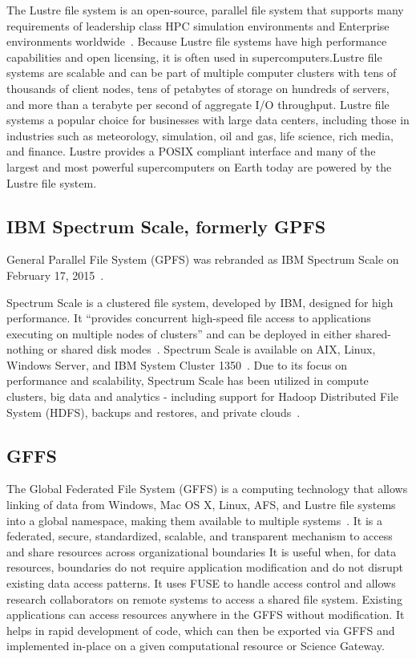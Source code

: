 The Lustre file system is an open-source, parallel file system that
supports many requirements of leadership class HPC simulation
environments and Enterprise environments
worldwide~\cite{www-lustre}. Because Lustre file systems have high
performance capabilities and open licensing, it is often used in
supercomputers.Lustre file systems are scalable and can be part of
multiple computer clusters with tens of thousands of client nodes,
tens of petabytes of storage on hundreds of servers, and more than a
terabyte per second of aggregate I/O throughput. Lustre file systems a
popular choice for businesses with large data centers, including those
in industries such as meteorology, simulation, oil and gas, life
science, rich media, and finance. Lustre provides a POSIX compliant
interface and many of the largest and most powerful supercomputers on
Earth today are powered by the Lustre file system.

     \pv
     
\subsection{IBM Spectrum Scale, formerly GPFS}

General Parallel File System (GPFS) was rebranded as IBM Spectrum
Scale on February 17, 2015~\cite{www-wikigpfs}.

Spectrum Scale is a clustered file system, developed by IBM, designed
for high performance. It ``provides concurrent high-speed file access
to applications executing on multiple nodes of clusters'' and can be
deployed in either shared-nothing or shared disk
modes~\cite{www-wikigpfs}.  Spectrum Scale is available on AIX, Linux,
Windows Server, and IBM System Cluster 1350~\cite{www-wikigpfs}.  Due
to its focus on performance and scalability, Spectrum Scale has been
utilized in compute clusters, big data and analytics - including
support for Hadoop Distributed File System (HDFS), backups and
restores, and private clouds~\cite{www-spectrumscale}.

     \pv

\subsection{GFFS}

The Global Federated File System (GFFS) is a computing technology that
allows linking of data from Windows, Mac OS X, Linux, AFS, and Lustre
file systems into a global namespace, making them available to
multiple systems~\cite{www-gffs}.  It is a federated, secure,
standardized, scalable, and transparent mechanism to access and share
resources across organizational boundaries It is useful when, for data
resources, boundaries do not require application modification and do
not disrupt existing data access patterns. It uses FUSE to handle
access control and allows research collaborators on remote systems to
access a shared file system. Existing applications can access
resources anywhere in the GFFS without modification. It helps in rapid
development of code, which can then be exported via GFFS and
implemented in-place on a given computational resource or Science
Gateway.

